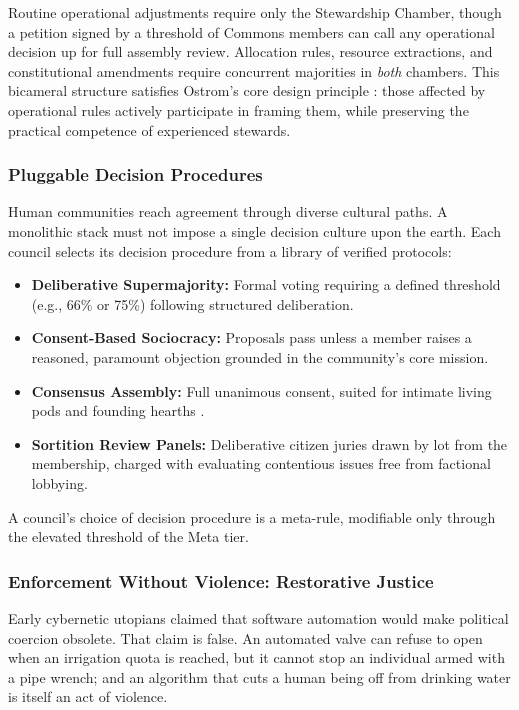 Routine operational adjustments require only the Stewardship Chamber, though a petition signed by a threshold of Commons members can call any operational decision up for full assembly review. Allocation rules, resource extractions, and constitutional amendments require concurrent majorities in \textit{both} chambers. This bicameral structure satisfies Ostrom's core design principle \parencite{ostrom1990}: those affected by operational rules actively participate in framing them, while preserving the practical competence of experienced stewards.

\subsubsection{Pluggable Decision Procedures}

Human communities reach agreement through diverse cultural paths. A monolithic stack must not impose a single decision culture upon the earth. Each council selects its decision procedure from a library of verified protocols:
\begin{itemize}
  \item \textbf{Deliberative Supermajority:} Formal voting requiring a defined threshold (e.g., 66\% or 75\%) following structured deliberation.
  \item \textbf{Consent-Based Sociocracy:} Proposals pass unless a member raises a reasoned, paramount objection grounded in the community's core mission.
  \item \textbf{Consensus Assembly:} Full unanimous consent, suited for intimate living pods and founding hearths \parencite{mansbridge1980}.
  \item \textbf{Sortition Review Panels:} Deliberative citizen juries drawn by lot from the membership, charged with evaluating contentious issues free from factional lobbying.
\end{itemize}
A council's choice of decision procedure is a meta-rule, modifiable only through the elevated threshold of the Meta tier.

\subsubsection{Enforcement Without Violence: Restorative Justice}
\label{sec:l5-sanctions}

Early cybernetic utopians claimed that software automation would make political coercion obsolete. That claim is false. An automated valve can refuse to open when an irrigation quota is reached, but it cannot stop an individual armed with a pipe wrench; and an algorithm that cuts a human being off from drinking water is itself an act of violence.

